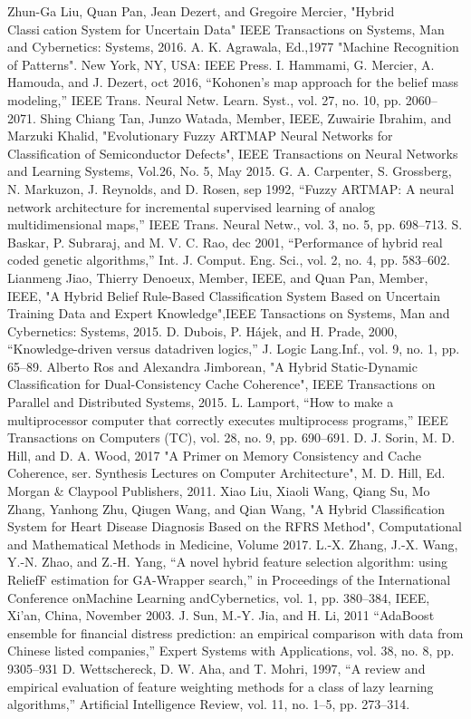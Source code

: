 \documentclass[10pt,a4paper,journal]{IEEEtran}
\begin{document}

 
\begin{thebibliography}{5}
 Zhun-Ga Liu, Quan Pan, Jean Dezert, and Gregoire Mercier, "Hybrid Classication System for Uncertain Data" IEEE Transactions on Systems, Man and Cybernetics: Systems, 2016.
 A. K. Agrawala, Ed.,1977 "Machine Recognition of Patterns". New York, NY, USA: IEEE Press.
 I. Hammami, G. Mercier, A. Hamouda, and J. Dezert, oct 2016, “Kohonen’s map approach for the belief mass modeling,” IEEE Trans. Neural Netw. Learn. Syst., vol. 27, no. 10, pp. 2060–2071.
 Shing Chiang Tan, Junzo Watada, Member, IEEE, Zuwairie Ibrahim, and Marzuki Khalid, "Evolutionary Fuzzy ARTMAP Neural Networks for Classification of Semiconductor Defects", IEEE Transactions on Neural Networks and Learning Systems, Vol.26, No. 5, May 2015.
 G. A. Carpenter, S. Grossberg, N. Markuzon, J. Reynolds, and D. Rosen, sep 1992, “Fuzzy ARTMAP: A neural network architecture for incremental supervised learning of analog multidimensional maps,” IEEE Trans. Neural Netw., vol. 3, no. 5, pp. 698–713.
 S. Baskar, P. Subraraj, and M. V. C. Rao, dec 2001, “Performance of hybrid real coded genetic algorithms,” Int. J. Comput. Eng. Sci., vol. 2, no. 4, pp. 583–602.
 Lianmeng Jiao, Thierry Denoeux, Member, IEEE, and Quan Pan, Member, IEEE, "A Hybrid Belief Rule-Based Classification System Based on Uncertain Training Data and Expert Knowledge",IEEE Tansactions on Systems, Man and Cybernetics: Systems, 2015.  
 D. Dubois, P. Hájek, and H. Prade, 2000, “Knowledge-driven versus datadriven logics,” J. Logic Lang.Inf., vol. 9, no. 1, pp. 65–89.
 Alberto Ros and Alexandra Jimborean, "A Hybrid Static-Dynamic Classification for Dual-Consistency Cache Coherence", IEEE Transactions on Parallel and Distributed Systems, 2015.
 L. Lamport, “How to make a multiprocessor computer that correctly executes multiprocess programs,” IEEE Transactions on Computers (TC), vol. 28, no. 9, pp. 690–691.
 D. J. Sorin, M. D. Hill, and D. A. Wood, 2017 "A Primer on Memory Consistency and Cache Coherence, ser. Synthesis Lectures on Computer Architecture", M. D. Hill, Ed. Morgan & Claypool Publishers, 2011.
 Xiao Liu, Xiaoli Wang, Qiang Su, Mo Zhang, Yanhong Zhu, Qiugen Wang, and Qian Wang, "A Hybrid Classification System for Heart Disease Diagnosis Based on the RFRS Method", Computational and Mathematical Methods in Medicine, Volume 2017. 
 L.-X. Zhang, J.-X. Wang, Y.-N. Zhao, and Z.-H. Yang, “A novel hybrid feature selection algorithm: using ReliefF estimation for GA-Wrapper search,” in Proceedings of the International Conference onMachine Learning andCybernetics, vol. 1, pp. 380–384, IEEE, Xi’an, China, November 2003.
 J. Sun, M.-Y. Jia, and H. Li, 2011 “AdaBoost ensemble for financial distress prediction: an empirical comparison with data from Chinese listed companies,” Expert Systems with Applications, vol. 38, no. 8, pp. 9305–931
 D. Wettschereck, D. W. Aha, and T. Mohri, 1997, “A review and empirical evaluation of feature weighting methods for a class of lazy learning algorithms,” Artificial Intelligence Review, vol. 11, no. 1–5, pp. 273–314.
\end{thebibliography}
\end{document}
